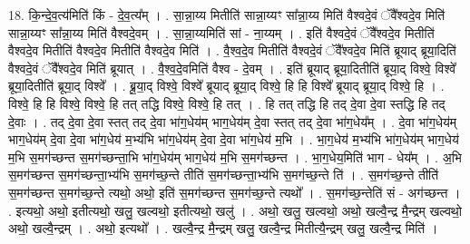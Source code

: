\documentclass[17pt]{extarticle}
\begin{document}
18. कि॒न्दे॒व॒त्य॑मिति॑ किं - दे॒व॒त्य᳚म् । . सा॒न्ना॒य्य मितीति॑ सान्ना॒य्यꣳ सा᳚न्ना॒य्य मिति॑ वैश्वदे॒वं ॅवै᳚श्वदे॒व मिति॑ सान्ना॒य्यꣳ सा᳚न्ना॒य्य मिति॑ वैश्वदे॒वम् । . सा॒न्ना॒य्यमिति॑ सां - ना॒य्यम् । . इति॑ वैश्वदे॒वं ॅवै᳚श्वदे॒व मितीति॑ वैश्वदे॒व मितीति॑ वैश्वदे॒व मितीति॑ वैश्वदे॒व मिति॑ । . वै॒श्व॒दे॒व मितीति॑ वैश्वदे॒वं ॅवै᳚श्वदे॒व मिति॑ ब्रूयाद् ब्रूया॒दिति॑ वैश्वदे॒वं ॅवै᳚श्वदे॒व मिति॑ ब्रूयात् । . वै॒श्व॒दे॒वमिति॑ वैश्व - दे॒वम् । . इति॑ ब्रूयाद् ब्रूया॒दितीति॑ ब्रूया॒द् विश्वे॒ विश्वे᳚ ब्रूया॒दितीति॑ ब्रूया॒द् विश्वे᳚ । . ब्रू॒या॒द् विश्वे॒ विश्वे᳚ ब्रूयाद् ब्रूया॒द् विश्वे॒ हि हि विश्वे᳚ ब्रूयाद् ब्रूया॒द् विश्वे॒ हि । . विश्वे॒ हि हि विश्वे॒ विश्वे॒ हि तत् तद्धि विश्वे॒ विश्वे॒ हि तत् । . हि तत् तद्धि हि तद् दे॒वा दे॒वा स्तद्धि हि तद् दे॒वाः । . तद् दे॒वा दे॒वा स्तत् तद् दे॒वा भा॑ग॒धेय॑म् भाग॒धेय॑म् दे॒वा स्तत् तद् दे॒वा भा॑ग॒धेय᳚म् । . दे॒वा भा॑ग॒धेय॑म् भाग॒धेय॑म् दे॒वा दे॒वा भा॑ग॒धेय॑ म॒भ्य॑भि भा॑ग॒धेय॑म् दे॒वा दे॒वा भा॑ग॒धेय॑ म॒भि । . भा॒ग॒धेय॑ म॒भ्य॑भि भा॑ग॒धेय॑म् भाग॒धेय॑ म॒भि स॒मग॑च्छन्त स॒मग॑च्छन्ता॒भि भा॑ग॒धेय॑म् भाग॒धेय॑ म॒भि स॒मग॑च्छन्त । . भा॒ग॒धेय॒मिति॑ भाग - धेय᳚म् । . अ॒भि स॒मग॑च्छन्त स॒मग॑च्छन्ता॒भ्य॑भि स॒मग॑च्छ॒न्ते तीति॑ स॒मग॑च्छन्ता॒भ्य॑भि स॒मग॑च्छ॒न्ते ति॑ । . स॒मग॑च्छ॒न्ते तीति॑ स॒मग॑च्छन्त स॒मग॑च्छ॒न्ते त्यथो॒ अथो॒ इति॑ स॒मग॑च्छन्त स॒मग॑च्छ॒न्ते त्यथो᳚ । . स॒मग॑च्छ॒न्तेति॑ सं - अग॑च्छन्त । . इत्यथो॒ अथो॒ इतीत्यथो॒ खलु॒ खल्वथो॒ इतीत्यथो॒ खलु॑ । . अथो॒ खलु॒ खल्वथो॒ अथो॒ खल्वै॒न्द्र मै॒न्द्रम् खल्वथो॒ अथो॒ खल्वै॒न्द्रम् । . अथो॒ इत्यथो᳚ । . खल्वै॒न्द्र मै॒न्द्रम् खलु॒ खल्वै॒न्द्र मितीत्यै॒न्द्रम् खलु॒ खल्वै॒न्द्र मिति॑ । \newline
\end{document}
